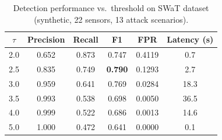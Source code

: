 \begin{table}[t]
\centering
\caption{Detection performance vs.\ threshold on SWaT dataset (synthetic, 22 sensors, 13 attack scenarios).}
\label{tab:detection_metrics}
\begin{tabular}{cccccc}
\toprule
$\tau$ & Precision & Recall & F1 & FPR & Latency (s) \\
\midrule
2.0 & 0.652 & 0.873 & 0.747 & 0.4119 & 0.7 \\
2.5 & 0.835 & 0.749 & \textbf{0.790} & 0.1293 & 2.7 \\
3.0 & 0.959 & 0.641 & 0.769 & 0.0284 & 18.3 \\
3.5 & 0.993 & 0.538 & 0.698 & 0.0050 & 36.5 \\
4.0 & 0.999 & 0.522 & 0.686 & 0.0013 & 14.6 \\
5.0 & 1.000 & 0.472 & 0.641 & 0.0000 & 0.1 \\
\bottomrule
\end{tabular}
\end{table}
